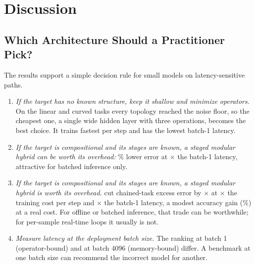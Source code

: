 \section{Discussion}
\label{sec:discussion}

\subsection{Which Architecture Should a Practitioner Pick?}
The results support a simple decision rule for small models on latency-sensitive paths.
\begin{enumerate}
\item \emph{If the target has no known structure, keep it shallow and minimize operators.} On the linear and
curved tasks every topology reached the noise floor, so the cheapest one, a single wide hidden layer with three
operations, becomes the best choice. It trains fastest per step and has the lowest batch-1 latency.
\ifcompact
\item \emph{If the target is compositional and its stages are known, a staged modular hybrid can be worth its
overhead:} \chainHBGain\% lower error at \latOneRatioHB$\times$ the batch-1 latency, attractive for batched inference only.
\else
\item \emph{If the target is compositional and its stages are known, a staged modular hybrid is worth its
overhead.} \HB cut chained-task excess error by \chainExcessRatio$\times$ at \stepRatioHB$\times$ the training cost per
step and \latOneRatioHB$\times$ the batch-1 latency, a modest accuracy gain (\chainHBGain\%) at a real cost. For offline or
batched inference, that trade can be worthwhile; for per-sample real-time loops it usually is not.
\fi
\item \emph{Measure latency at the deployment batch size.} The ranking at batch 1 (operator-bound) and at batch
4096 (memory-bound) differ. A benchmark at one batch size can recommend the incorrect model for another.
\end{enumerate}

